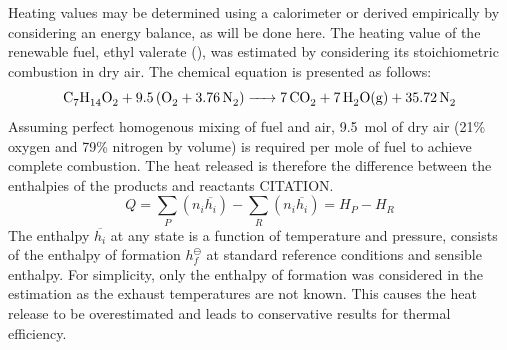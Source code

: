 \documentclass[11pt]{article}
\begin{document}
Heating values may be determined using a calorimeter or derived empirically by considering an energy balance, as will be done here. The heating value of the renewable fuel, ethyl valerate (), was estimated by considering its stoichiometric combustion in dry air. The chemical equation is presented as follows: 
\begin{equation}
    \ce{C7H14O2 + 9.5(O2 + 3.76N2) -> 7CO2 + 7H2O(g) + 35.72N2} \label{q3-1}
\end{equation}
Assuming perfect homogenous mixing of fuel and air, \SI{9.5}{\mol} of dry air (21\% oxygen and 79\% nitrogen by volume) is required per mole of fuel to achieve complete combustion. The heat released is therefore the difference between the enthalpies of the products and reactants CITATION.
\begin{equation}
    Q = \sum_P \left(n_i\overline{h_i}\right) - \sum_R \left(n_i\overline{h_i}\right) = H_P - H_R \label{q3-2}
\end{equation}
The enthalpy $\overline{h_i}$ at any state is a function of temperature and pressure, consists of the enthalpy of formation $h_f^{\ominus}$ at standard reference conditions and sensible enthalpy. For simplicity, only the enthalpy of formation was considered in the estimation as the exhaust temperatures are not known. This causes the heat release to be overestimated and leads to conservative results for thermal efficiency. 
\end{document}

